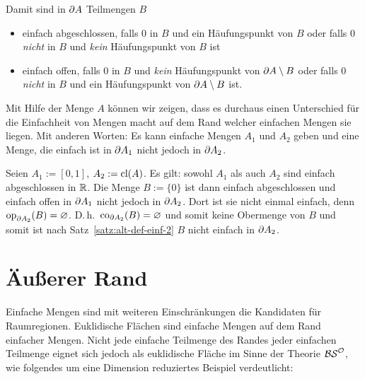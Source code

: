     \noindent
    Damit sind in $\partial A$ Teilmengen $B$
    \begin{itemize}
        \item einfach abgeschlossen, falls $0$ in $B$ und ein Häufungspunkt von $B$ oder falls $0$ \textit{nicht} in $B$ und \textit{kein} Häufungspunkt von $B$ ist
        \item einfach offen, falls $0$ in $B$ und \textit{kein} Häufungspunkt von $\partial A \setminus B$ oder falls $0$ \textit{nicht} in $B$ und ein Häufungspunkt von $\partial A \setminus B$ ist.
    \end{itemize}
    
    \noindent
    Mit
    Hilfe der Menge $A$ können wir zeigen, dass es durchaus einen Unterschied für die Einfachheit von Mengen macht auf dem Rand welcher einfachen Mengen sie liegen.
    Mit anderen Worten: Es kann einfache Mengen $A_1$ und $A_2$ geben und eine Menge, die einfach ist in $\partial A_1$ nicht jedoch in $\partial A_2$.

    \begin{bsp}
         Seien $A_1 := [0,1]$, $A_2 := \text{cl}(A)$.
         Es gilt: sowohl $A_1$ als auch $A_2$ sind einfach abgeschlossen in $\mathbb{R}$. 
         Die Menge $B := \{0\}$ ist dann einfach abgeschlossen und einfach offen in $\partial A_1$ nicht jedoch in $\partial A_2$.
         Dort ist sie nicht einmal einfach, denn $\text{op}_{\partial A_2} (B) = \varnothing$. D.\,h.\ $\text{co}_{\partial A_2}(B) = \varnothing$ und somit keine Obermenge von $B$ und somit ist nach Satz~\ref{satz:alt-def-einf-2} $B$ nicht einfach in $\partial A_2$.
    \end{bsp}

    
    
\section{Äußerer Rand}\label{sec:aeusserer-rand}

    Einfache
    Mengen sind mit weiteren Einschränkungen die Kandidaten für Raumregionen. Euklidische Flächen sind einfache Mengen auf dem Rand einfacher Mengen.
    Nicht jede einfache Teilmenge des Randes jeder einfachen Teilmenge eignet sich jedoch als euklidische Fläche im Sinne der Theorie $\mathcal{BS}^{\mathcal{O}}$, wie folgendes um eine Dimension reduziertes Beispiel verdeutlicht:
    
